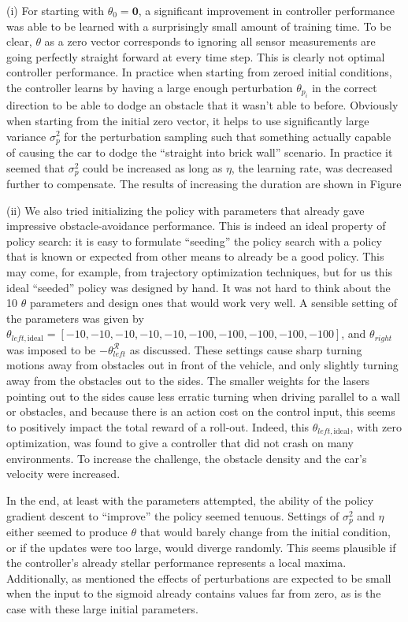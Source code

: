 \documentclass{article}
\begin{document}
(i) For starting with $\theta_0 = \mathbf{0}$, a significant improvement in controller performance was able to be learned with a surprisingly small amount of training time.  To be clear, $\theta$ as a zero vector corresponds to ignoring all sensor measurements are going perfectly straight forward at every time step.  This is clearly not optimal controller performance.  In practice when starting from zeroed initial conditions, the controller learns by having a large enough perturbation $\theta_{p_i}$ in the correct direction to be able to dodge an obstacle that it wasn't able to before.  Obviously when starting from the initial zero vector, it helps to use significantly large variance $\sigma_p^2$ for the perturbation sampling such that something actually capable of causing the car to dodge the ``straight into brick wall'' scenario.  In practice it seemed that $\sigma_p^2$ could be increased as long as $\eta$, the learning rate, was decreased further to compensate.  The results  of increasing the duration are shown in Figure \label{figures/policySearch_zeroVector_duration.png}

(ii) We also tried initializing the policy with parameters that already gave impressive obstacle-avoidance performance.  This is indeed an ideal property of policy search: it is easy to formulate ``seeding'' the policy search with a policy that is known or expected from other means to already be a good policy.  This may come, for example, from trajectory optimization techniques, but for us this ideal ``seeded'' policy was designed by hand. It was not hard to think about the 10 $\theta$ parameters and design ones that would work very well.  A sensible setting of the parameters was given by $\theta_{left, \text{ideal}} = [-10, -10, -10, -10, -10, -100, -100, -100, -100, -100 ]$, and $\theta_{right}$ was imposed to be $-\theta_{left}^{\mathcal{R}}$ as discussed. These settings cause sharp turning motions away from obstacles out in front of the vehicle, and only slightly turning away from the obstacles out to the sides.  The smaller weights for the lasers pointing out to the sides cause less erratic turning when driving parallel to a wall or obstacles, and because there is an action cost on the control input, this seems to positively impact the total reward of a roll-out.  Indeed, this $\theta_{left, \text{ideal}} $, with zero optimization, was found to give a controller that did not crash on many environments.  To increase the challenge, the obstacle density and the car's velocity were increased.

In the end, at least with the parameters attempted, the ability of the policy gradient descent to ``improve'' the policy seemed tenuous.  Settings of $\sigma_p^2$ and $\eta$ either seemed to produce $\theta$ that would barely change from the initial condition, or if the updates were too large, would diverge randomly.  This seems plausible if the controller's already stellar performance represents a local maxima.  Additionally, as mentioned the effects of perturbations are expected to be small when the input to the sigmoid already contains values far from zero, as is the case with these large initial parameters.
\end{document}

